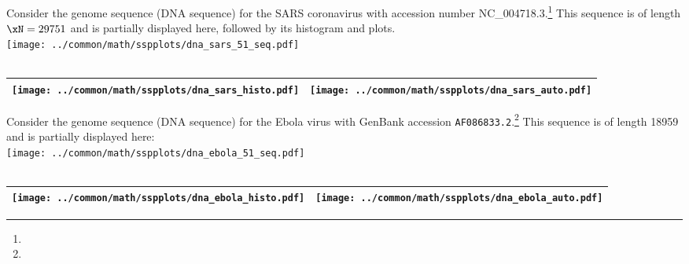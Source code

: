 \begin{example}
\label{ex:dna_sars}
Consider the genome sequence (DNA sequence) for the SARS coronavirus with  accession number NC\_004718.3.\footnote{} %
This sequence is of length $\xN=29751$ and is partially displayed here, followed by its histogram and 
 plots.
  \\\texttt{[image: ../common/math/sspplots/dna\_sars\_51\_seq.pdf]}\\
     \\\begin{tabular}{|>{\scs}c|>{\scs}c|}
          \hline
          \texttt{[image: ../common/math/sspplots/dna\_sars\_histo.pdf]}%
         &\texttt{[image: ../common/math/sspplots/dna\_sars\_auto.pdf]}
        \\\hline
     \end{tabular}
\end{example}

\begin{example}
\label{ex:dna_ebola}
Consider the genome sequence (DNA sequence) for the Ebola virus with GenBank accession \lstinline{AF086833.2}.\footnote{}
This sequence is of length 18959 and is partially displayed here:
  \\\texttt{[image: ../common/math/sspplots/dna\_ebola\_51\_seq.pdf]}\\
     \\\begin{tabular}{|>{\scs}c|>{\scs}c|}
          \hline
          \texttt{[image: ../common/math/sspplots/dna\_ebola\_histo.pdf]}%
         &\texttt{[image: ../common/math/sspplots/dna\_ebola\_auto.pdf]}
        \\\hline
     \end{tabular}
\end{example}

